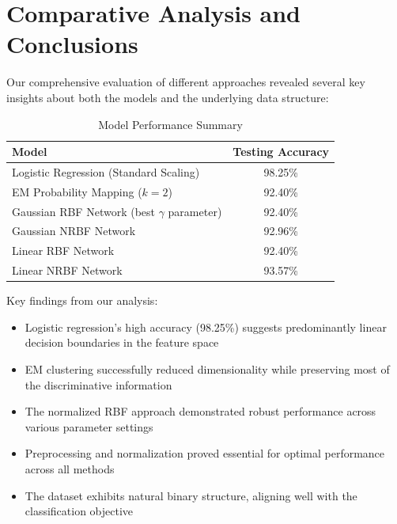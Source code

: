 \documentclass[11pt]{article}
\begin{document}
\section{Comparative Analysis and Conclusions}

Our comprehensive evaluation of different approaches revealed several key insights about both the models and the underlying data structure:

\begin{table}[H]
\centering
\caption{Model Performance Summary}
\begin{tabular}{@{}lc@{}}
\toprule
Model                                           & Testing Accuracy \\ \midrule
Logistic Regression (Standard Scaling)          & 98.25\%          \\
EM Probability Mapping ($k=2$)                  & 92.40\%          \\
Gaussian RBF Network (best $\gamma$ parameter)  & 92.40\%          \\
Gaussian NRBF Network                           & 92.96\%          \\
Linear RBF Network                              & 92.40\%          \\
Linear NRBF Network                             & 93.57\%          \\ \bottomrule
\end{tabular}
\end{table}

Key findings from our analysis:
\begin{itemize}
  \setlength{\itemsep}{0pt}
    \item Logistic regression's high accuracy (98.25\%) suggests predominantly linear decision boundaries in the feature space
    \item EM clustering successfully reduced dimensionality while preserving most of the discriminative information
    \item The normalized RBF approach demonstrated robust performance across various parameter settings
    \item Preprocessing and normalization proved essential for optimal performance across all methods
    \item The dataset exhibits natural binary structure, aligning well with the classification objective
\end{itemize}

\newpage
\end{document}

